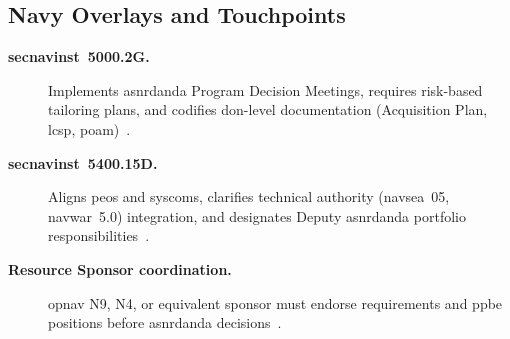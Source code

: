 \documentclass[../main.tex]{subfiles}
\begin{document}
\subsection{Navy Overlays and Touchpoints}
\begin{description}
\item[\textbf{\ac{secnavinst}~5000.2G.}] Implements \ac{asnrdanda} Program Decision Meetings, requires risk-based tailoring plans, and codifies \ac{don}-level documentation (Acquisition Plan, \ac{lcsp}, \ac{poam})~\autocite{SECNAV5000-2G}.
\item[\textbf{\ac{secnavinst}~5400.15D.}] Aligns \acp{peo} and \acp{syscom}, clarifies technical authority (\ac{navsea}~05, \ac{navwar}~5.0) integration, and designates Deputy \ac{asnrdanda} portfolio responsibilities~\autocite{SECNAV5400-15D}.
  \item[\textbf{Resource Sponsor coordination.}] \ac{opnav} N9, N4, or equivalent sponsor must endorse requirements and \ac{ppbe} positions before \ac{asnrdanda} decisions~\autocite{edo-3-3-1-acq-policy-players-2025}.
\end{description}

\end{document}
